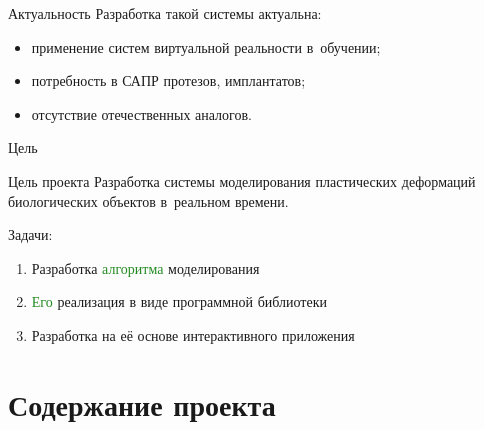 \documentclass[usenames,dvipsnames,pdftex,unicode,hidelinks]{beamer}
\begin{document}
  \begin{frame}{Актуальность}
    Разработка такой системы актуальна:
    \begin{itemize}
      \item применение систем виртуальной реальности в~обучении;
      \item потребность в САПР протезов, имплантатов;
      \item отсутствие отечественных аналогов.
    \end{itemize}

    \vspace{0.5cm}

  \end{frame}

  \begin{frame}{Цель}
    \begin{block}{Цель проекта}
      Разработка \alert{системы моделирования} пластических деформаций биологических объектов
      \alert{в~реальном времени}.
    \end{block}

    \vspace{0.5cm}

    Задачи:
    \begin{enumerate}
      \item Разработка \textcolor{ForestGreen}{алгоритма} моделирования
      \item \textcolor{ForestGreen}{Его} реализация в виде \textcolor{RoyalPurple}{программной библиотеки}
      \item Разработка на \textcolor{RoyalPurple}{её} основе \textcolor{NavyBlue}{интерактивного приложения}
    \end{enumerate}
  \end{frame}

  \section{Содержание проекта}
\end{document}
